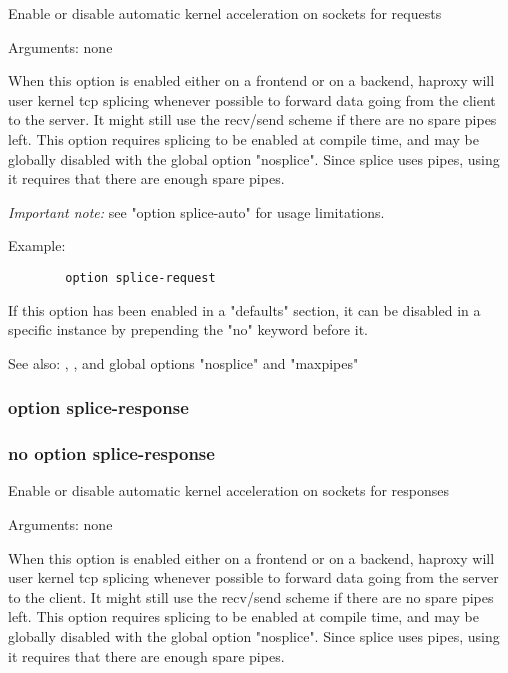 
  Enable or disable automatic kernel acceleration on sockets for requests


  Arguments: none

  When this option is enabled either on a frontend or on a backend, haproxy
  will user kernel tcp splicing whenever possible to forward data going from
  the client to the server. It might still use the recv/send scheme if there
  are no spare pipes left. This option requires splicing to be enabled at
  compile time, and may be globally disabled with the global option "nosplice".
  Since splice uses pipes, using it requires that there are enough spare pipes.

  \emph{Important note:} see "option splice-auto" for usage limitations.

  Example:
  \begin{verbatim}
        option splice-request
  \end{verbatim}
  
  If this option has been enabled in a "defaults" section, it can be disabled
  in a specific instance by prepending the "no" keyword before it.

  See also: , , and global options
             "nosplice" and "maxpipes"

\subsubsection{option splice-response}
\subsubsection{no option splice-response}


  Enable or disable automatic kernel acceleration on sockets for responses


  Arguments: none

  When this option is enabled either on a frontend or on a backend, haproxy
  will user kernel tcp splicing whenever possible to forward data going from
  the server to the client. It might still use the recv/send scheme if there
  are no spare pipes left. This option requires splicing to be enabled at
  compile time, and may be globally disabled with the global option "nosplice".
  Since splice uses pipes, using it requires that there are enough spare pipes.

